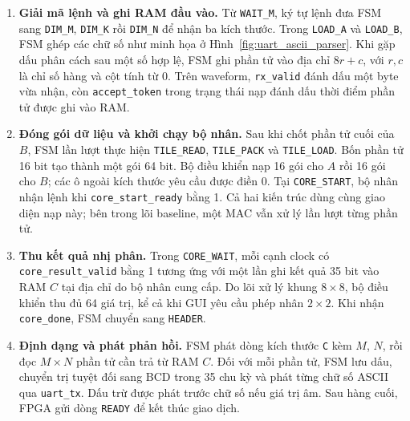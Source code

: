 \begin{enumerate}
    \item \textbf{Giải mã lệnh và ghi RAM đầu vào.}
    Từ \texttt{WAIT\_M}, ký tự lệnh đưa FSM sang
    \texttt{DIM\_M}, \texttt{DIM\_K} rồi \texttt{DIM\_N} để nhận
    ba kích thước. Trong \texttt{LOAD\_A} và \texttt{LOAD\_B},
    FSM ghép các chữ số như minh họa ở
    Hình~\ref{fig:uart_ascii_parser}. Khi gặp dấu phân cách sau
    một số hợp lệ, FSM ghi phần tử vào địa chỉ $8r+c$, với $r,c$
    là chỉ số hàng và cột tính từ 0. Trên waveform,
    \texttt{rx\_valid} đánh dấu một byte vừa nhận, còn
    \texttt{accept\_token} trong trạng thái nạp đánh dấu thời điểm
    phần tử được ghi vào RAM.

    \item \textbf{Đóng gói dữ liệu và khởi chạy bộ nhân.}
    Sau khi chốt phần tử cuối của $B$, FSM lần lượt thực hiện
    \texttt{TILE\_READ}, \texttt{TILE\_PACK} và \texttt{TILE\_LOAD}.
    Bốn phần tử 16 bit tạo thành một gói 64 bit. Bộ điều khiển nạp
    16 gói cho $A$ rồi 16 gói cho $B$; các ô ngoài kích thước yêu
    cầu được điền 0. Tại \texttt{CORE\_START}, bộ nhân nhận lệnh
    khi \texttt{core\_start\_ready} bằng 1. Cả hai kiến trúc dùng
    cùng giao diện nạp này; bên trong lõi baseline, một MAC vẫn
    xử lý lần lượt từng phần tử.

    \item \textbf{Thu kết quả nhị phân.}
    Trong \texttt{CORE\_WAIT}, mỗi cạnh clock có
    \texttt{core\_result\_valid} bằng 1 tương ứng với một lần ghi
    kết quả 35 bit vào RAM $C$ tại địa chỉ do bộ nhân cung cấp.
    Do lõi xử lý khung $8\times8$, bộ điều khiển thu đủ 64 giá trị,
    kể cả khi GUI yêu cầu phép nhân $2\times2$. Khi nhận
    \texttt{core\_done}, FSM chuyển sang \texttt{HEADER}.

    \item \textbf{Định dạng và phát phản hồi.}
    FSM phát dòng kích thước \texttt{C} kèm $M$, $N$, rồi đọc
    $M\times N$ phần tử cần trả từ RAM $C$. Đối với mỗi phần tử,
    FSM lưu dấu, chuyển trị tuyệt đối sang BCD trong 35 chu kỳ
    và phát từng chữ số ASCII qua \texttt{uart\_tx}. Dấu trừ
    được phát trước chữ số nếu giá trị âm. Sau hàng cuối, FPGA
    gửi dòng \texttt{READY} để kết thúc giao dịch.
\end{enumerate}

